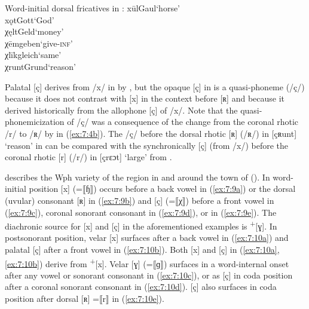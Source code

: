 \ea%
\label{ex:7:8}Word-initial dorsal fricatives in :
\ea\label{ex:7:8a} xūl\tab [xuːl]\tab Gaul\tab ‘horse’\\
 xǫt\tab [xɔt]\tab Gott\tab ‘God’\\
\ex\label{ex:7:8b} χęlt\tab [çɛlt]\tab Geld\tab ‘money’\\
 χēm\tab [çeːm]\tab geben\tab ‘give-\textsc{inf}’\\
\ex\label{ex:7:8c} χlīk\tab [çliːk]\tab gleich\tab ‘same’\\
\ex\label{ex:7:8d} χrunt\tab [çʀunt]\tab Grund\tab ‘reason’
\z
\z

Palatal [ç] derives from /x/ in  by , but the opaque [ç] in  is a quasi-phoneme (/ç/) because it does not contrast with [x] in the context before [ʀ] and because it derived historically from the allophone [ç] of /x/. Note that the quasi-phonemicization of /ç/ was a consequence of the change from the coronal rhotic /r/ to /ʀ/ by  in (\ref{ex:7:4b}). The  /ç/ before the dorsal rhotic [ʀ] (/ʀ/) in [çʀunt] ‘reason’ in  can be compared with the synchronically  [ç] (from /x/) before the coronal rhotic [r] (/r/) in  [çrɛɔt] ‘large’ from .


\citet{Böger1906} describes the Wph variety of the region in and around the town of  (). In word-initial position [x] (=⟦ɧ⟧) occurs before a back vowel in (\ref{ex:7:9a}) or the dorsal (uvular) consonant [ʀ] in (\ref{ex:7:9b}) and [ç] (=⟦χ⟧) before a front vowel in (\ref{ex:7:9c}), coronal sonorant consonant in (\ref{ex:7:9d}), or  in (\ref{ex:7:9e}). The diachronic source for [x] and [ç] in the aforementioned examples is   \textsuperscript{+}[ɣ]. In postsonorant position, velar [x] surfaces after a back vowel in (\ref{ex:7:10a}) and palatal [ç] after a front vowel in (\ref{ex:7:10b}). Both [x] and [ç] in (\ref{ex:7:10a}, \ref{ex:7:10b}) derive from   \textsuperscript{+}[x]. Velar [ɣ] (=⟦ɡ⟧) surfaces in a word-internal onset after any vowel or sonorant consonant in (\ref{ex:7:10c}), or as [ç] in coda position after a coronal sonorant consonant in (\ref{ex:7:10d}). [ç] also surfaces in coda position after dorsal [ʀ] =⟦r⟧ in (\ref{ex:7:10e}).

